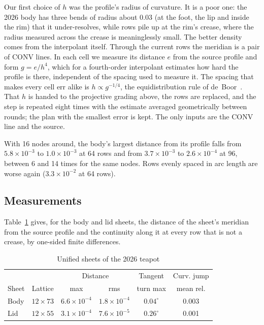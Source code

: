 \documentclass[journal]{IEEEtran}
\begin{document}
Our first choice of $h$ was the profile's radius of curvature. It is a
poor one: the 2026 body has three bends of radius about 0.03 (at the
foot, the lip and inside the rim) that it under-resolves, while rows pile
up at the rim's crease, where the radius measured across the crease is
meaninglessly small. The better density comes from the interpolant
itself. Through the current rows the meridian is a pair of CONV lines.
In each cell we measure its distance $e$ from the source profile and form
$g=e/h^4$, which for a fourth-order interpolant estimates how hard the
profile is there, independent of the spacing used to measure it. The
spacing that makes every cell err alike is $h\propto g^{-1/4}$, the
equidistribution rule of de~Boor~\cite{deboor1973}. That $h$ is handed
to the projective grading above, the rows are replaced, and the step is
repeated eight times with the estimate averaged geometrically between
rounds; the plan with the smallest error is kept. The only inputs are
the CONV line and the source.

With 16 nodes around, the body's largest distance from its profile falls
from $5.8\times10^{-3}$ to $1.0\times10^{-3}$ at 64 rows and from
$3.7\times10^{-3}$ to $2.6\times10^{-4}$ at 96, between 6 and 14 times
for the same nodes. Rows evenly spaced in arc length are worse again
($3.3\times10^{-2}$ at 64 rows).

\subsection{Measurements}

Table~\ref{tab:unified} gives, for the body and lid sheets, the distance
of the sheet's meridian from the source profile and the continuity along
it at every row that is not a crease, by one-sided finite differences.

\begin{table}[H]
\caption{Unified sheets of the 2026 teapot}
\label{tab:unified}
\centering
\scriptsize
\setlength{\tabcolsep}{2.6pt}
\begin{tabular}{l|c|cc|cc}
\hline
 & & \multicolumn{2}{c|}{Distance} & Tangent & Curv. jump\\
Sheet & Lattice & max & rms & turn max & mean rel.\\
\hline
Body & $12\times73$ & $6.6\times10^{-4}$ & $1.8\times10^{-4}$ & $0.04^\circ$ & 0.003\\
Lid & $12\times55$ & $3.1\times10^{-4}$ & $7.6\times10^{-5}$ & $0.26^\circ$ & 0.001\\
\hline
\end{tabular}
\end{table}
\end{document}
